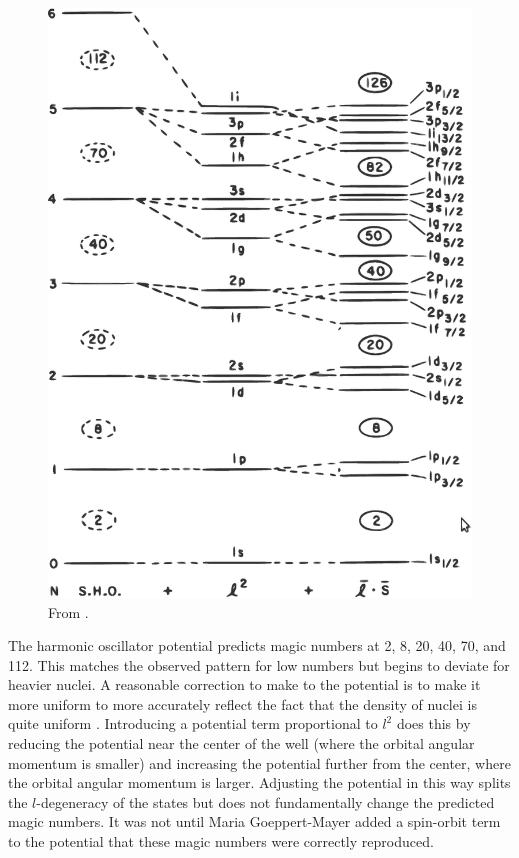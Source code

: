 \begin{figure}[htp]
\centering
\includegraphics[width=1.0\textwidth]{figures/nuclearLevels.eps}
\caption{From \cite{Casten}.}
\label{fig:shellModelMagic}
\end{figure}
The harmonic oscillator potential predicts magic numbers at 2, 8, 20, 40, 70, and 112.  This matches the observed pattern for low numbers but begins to deviate for heavier nuclei.  A reasonable correction to make to the potential is to make it more uniform to more accurately reflect the fact that the density of nuclei is quite uniform \cite{Casten}.  Introducing a potential term proportional to $l^2$ does this by reducing the potential near the center of the well (where the orbital angular momentum is smaller) and increasing the potential further from the center, where the orbital angular momentum is larger.  Adjusting the potential in this way splits the $l$-degeneracy of the states but does not fundamentally change the predicted magic numbers.  It was not until Maria Goeppert-Mayer added a spin-orbit term to the potential \cite{MGM} that these magic numbers were correctly reproduced.  

